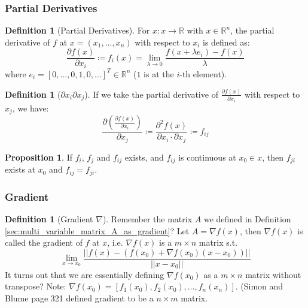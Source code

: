 \documentclass[12pt]{article}
\newcommand{\R}{{\mathbb R}}
\theoremstyle{definition}
\newtheorem{definition}[theorem]{Definition}
\newtheorem{proposition}[theorem]{Proposition}
\theoremstyle{plain}
\begin{document}
\subsubsection{Partial Derivatives }
\begin{definition}
    [Partial Derivatives] For $x : x \to \R$ with $x \in\R^n$, the partial 
    derivative of $f$ at $x = (x_1, \ldots, x_n)$ with respect to $x_i$ is defined as: 
    \[
        \frac{\partial f(x)}{\partial x_i} \coloneqq f_i(x) = \lim_{\lambda \to 
        0} \frac{f(x + \lambda e_i)  - f(x)}{\lambda}
    \]
    where $e_i = [0,\ldots, 0, 1, 0,\ldots]^T \in \R^n$ ($1$ is at the $i$-th 
    element).
\end{definition}

\begin{definition}
    [$\partial x_i \partial x_j$]
If we take the partial derivative of $\frac{\partial f(x)}{\partial x_i}$ with 
respect to $x_j$, we have: 
\[
\frac{\partial \left( \frac{\partial f(x)}{\partial x_i} \right)}{\partial x_j} 
\coloneqq \frac{\partial^2 f(x)}{ \partial x_i \cdot \partial x_j} \coloneqq 
f_{ij}
\]
\end{definition}

\begin{proposition}
If $f_i$, $f_j$ and $f_{ij}$ exists, and $f_{ij}$ is continuous at $x_0 \in x$, 
then $f_{ji}$ exists at $x_0$ and $f_{ij} = f_{ji}$.
\end{proposition}

\subsubsection{Gradient}
\begin{definition}
    [Gradient $\nabla$]
    Remember the matrix $A$ we defined in Definition 
    \ref{sec:multi_variable_matrix_A_as_gradient}? Let $A = \nabla f(x)$, then 
    $\nabla f(x)$ is called the gradient of $f$ at $x$, i.e. $\nabla f(x)$ is a 
    $m\times n$ matrix s.t. 
    \[
        \lim_{x \to x_0} \frac{||f(x) -\left( f(x_0) + \nabla f(x_0)(x - x_0) 
        \right)||}{||x - x_0||}
    \]
    It turns out that we are essentially defining $\nabla f(x_0)$ as a $m \times n$ matrix without 
    transpose? Note: $\nabla f(x_0) = [f_1(x_0), f_2(x_0), \ldots, 
    f_n(x_n)]$. (Simon and Blume page 321 defined gradient to be a $n \times m$ 
    matrix.
\end{definition}
\end{document}
